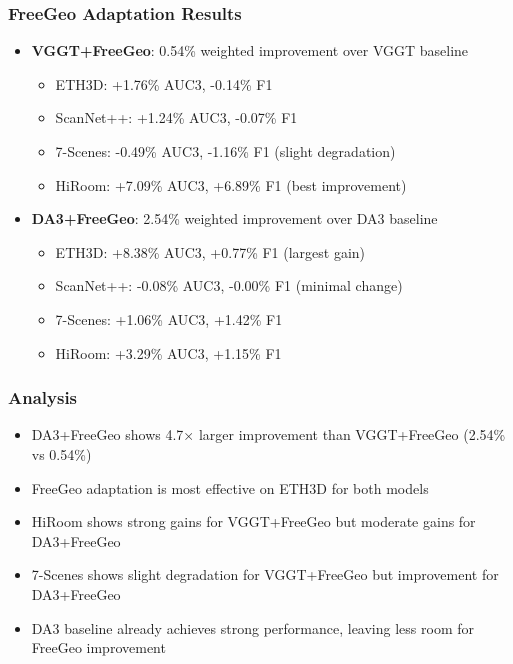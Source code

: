 \documentclass{article}
\begin{document}
\subsubsection{FreeGeo Adaptation Results}
\begin{itemize}
    \item \textbf{VGGT+FreeGeo}: 0.54\% weighted improvement over VGGT baseline
    \begin{itemize}
        \item ETH3D: +1.76\% AUC3, -0.14\% F1
        \item ScanNet++: +1.24\% AUC3, -0.07\% F1
        \item 7-Scenes: -0.49\% AUC3, -1.16\% F1 (slight degradation)
        \item HiRoom: +7.09\% AUC3, +6.89\% F1 (best improvement)
    \end{itemize}

    \item \textbf{DA3+FreeGeo}: 2.54\% weighted improvement over DA3 baseline
    \begin{itemize}
        \item ETH3D: +8.38\% AUC3, +0.77\% F1 (largest gain)
        \item ScanNet++: -0.08\% AUC3, -0.00\% F1 (minimal change)
        \item 7-Scenes: +1.06\% AUC3, +1.42\% F1
        \item HiRoom: +3.29\% AUC3, +1.15\% F1
    \end{itemize}
\end{itemize}

\subsubsection{Analysis}
\begin{itemize}
    \item DA3+FreeGeo shows 4.7× larger improvement than VGGT+FreeGeo (2.54\% vs 0.54\%)
    \item FreeGeo adaptation is most effective on ETH3D for both models
    \item HiRoom shows strong gains for VGGT+FreeGeo but moderate gains for DA3+FreeGeo
    \item 7-Scenes shows slight degradation for VGGT+FreeGeo but improvement for DA3+FreeGeo
    \item DA3 baseline already achieves strong performance, leaving less room for FreeGeo improvement
\end{itemize}
\end{document}
